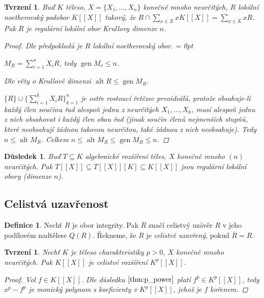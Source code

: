 \documentclass[11pt,a4paper]{article}
\DeclareMathOperator{\alt}{alt} %
\DeclareMathOperator{\gen}{gen} %
\let \icl \overline %
\newenvironment{items}{%
	\itemize
	\itemsep = 0pt%
}{%
	\enditemize
}
\newcounter{numb}
\theoremstyle{definition}
\newtheorem*{definice}{Definice}
\theoremstyle{plain}
\newtheorem{tvrzeni}[numb]{Tvrzení}
\newtheorem{dusledek}[numb]{Důsledek}
\begin{document}
\begin{tvrzeni} \label{thm:R_reg}
	Buď $K$ těleso, $X = \{X_1, \hdots, X_n\}$ konečně mnoho neurčitých, $R$ lokální noetherovský podobor $K[[X]]$ takový, že $R \cap \sum_{x \in X} x K[[X]] = \sum_{x \in X} x R$. Pak $R$ je regulární lokální obor Krullovy dimenze $n$.

	\begin{proof}
		Dle předpokladů je $R$ lokální noetherovský obor.
		\begin{items}
			\item $M_R = \sum_{i = 1}^n X_i R$, tedy $\gen M_r \leq n$.
			\item Dle věty o Krullově dimenzi $\alt R \leq \gen M_R$.
			\item $\{R\}\cup\{\sum_{i = 1}^k X_i R\}_{k = 1}^n$ je ostře rostoucí řetězec prvoideálů, protože obsahuje-li každý člen součinu řad alespoň jednu z neurčitých $X_1, \hdots, X_k$, musí alespoň jednu z nich obsahovat i každý člen obou řad (jinak součin členů nejmenších stupňů, které neobsahují žádnou takovou neurčitou, také žádnou z nich neobsahuje). Tedy $n \leq \alt M_R$.
		\end{items}
		Celkem $n \leq \alt M_R \leq \gen M_R \leq n$.
	\end{proof}
\end{tvrzeni}

\begin{dusledek} \label{thm:reg}
	Buď $T \subseteq K$ algebraické rozšíření těles, $X$ konečně mnoho $(n)$ neurčitých. Pak $T[[X]] \subseteq T[[X]][K] \subseteq K[[X]]$ jsou regulární lokální obory (dimenze $n$).
\end{dusledek}


\subsection{Celistvá uzavřenost}

\begin{definice}
	Nechť $R$ je obor integrity. Pak $\icl{R}$ značí celistvý uzávěr $R$ v jeho podílovém nadtělese $Q(R)$. Řekneme, že $R$ je \emph{celistvě uzavřený}, pokud $\icl{R} = R$.
\end{definice}

\begin{tvrzeni}	\label{thm:KX_integral}
	Nechť $K$ je těleso charakteristiky $p > 0$, $X$ konečně mnoho neurčitých. Pak $K[[X]]$ je celistvé rozšíření $K^p[[X]]$.

	\begin{proof}
		Vol $f \in K[[X]]$. Dle důsledku $\ref{thm:p_power}$ platí $f^p \in K^p[[X]]$, tedy $x^p - f^p$ je monický polynom s koeficienty v $K^p[[X]]$, jehož je $f$ kořenem.
	\end{proof}
\end{tvrzeni}
\end{document}
